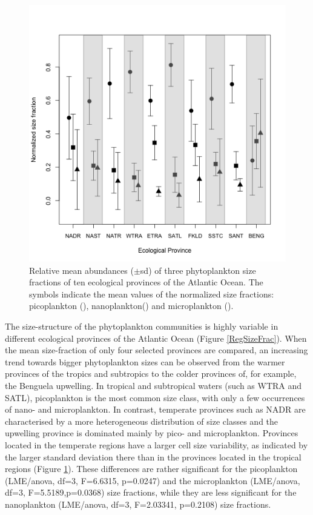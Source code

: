 \begin{figure}
\centering
\includegraphics[trim = 0mm 0mm 0mm 0mm, clip, width=0.9\linewidth]{./Chp2-Pre/amt_MeanSDProvinces.png}
\caption[Scheme]{\small {Relative mean abundances ($\pm$sd) of three phytoplankton size fractions of ten ecological provinces of the Atlantic Ocean. The symbols indicate the mean values of the normalized size fractions: picoplankton (), nanoplankton() and microplankton ().}}
\label{means}
\end{figure}

The size-structure of the phytoplankton communities is highly variable in different ecological provinces of the Atlantic Ocean (Figure \ref{RegSizeFrac}). When the mean size-fraction of only four selected provinces are compared, an increasing trend towards bigger phytoplankton sizes can be observed from the warmer provinces of the tropics and subtropics to the colder provinces of, for example, the Benguela upwelling. In tropical and subtropical waters (such as WTRA and SATL), picoplankton is the most common size class, with only a few occurrences of nano- and microplankton. In contrast, temperate provinces such as NADR are characterised by a more heterogeneous distribution of size classes and the upwelling province is dominated mainly by pico- and microplankton. Provinces located in the temperate regions have a larger cell size variability, as indicated by the larger standard deviation there than in the provinces located in the tropical regions (Figure \ref{means}). These differences are rather significant for the picoplankton (LME/anova, df=3, F=6.6315, p=0.0247) and the microplankton (LME/anova, df=3, F=5.5189,p=0.0368) size fractions, while they are less significant for the nanoplankton (LME/anova, df=3, F=2.03341, p=0.2108) size fractions.

